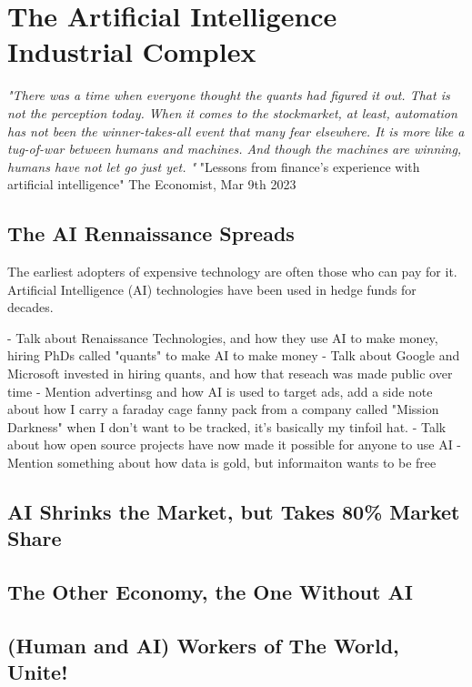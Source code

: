 \setchapterpreamble[u]{\margintoc}
\chapter{The Artificial Intelligence Industrial Complex}

\textit{"There was a time when everyone thought the quants had figured it out. That is not the perception today. When it comes to the stockmarket, at least, automation has not been the winner-takes-all event that many fear elsewhere. It is more like a tug-of-war between humans and machines. And though the machines are winning, humans have not let go just yet. "} "Lessons from finance's experience with artificial intelligence" The Economist, Mar 9th 2023 \cite{finaieconomist}


\section{The AI Rennaissance Spreads}

The earliest adopters of expensive technology are often those who can pay for it. Artificial Intelligence (AI) technologies have been used in hedge funds for decades.

- Talk about Renaissance Technologies, and how they use AI to make money, hiring PhDs called "quants" to make AI to make money
- Talk about Google and Microsoft invested in hiring quants, and how that reseach was made public over time
- Mention advertinsg and how AI is used to target ads, add a side note about how I carry a faraday cage fanny pack from a company called "Mission Darkness" when I don't want to be tracked, it's basically my tinfoil hat.
- Talk about how open source projects have now made it possible for anyone to use AI
-Mention something about how data is gold, but informaiton wants to be free

\section{AI Shrinks the Market, but Takes 80\% Market Share}

\section{The Other Economy, the One Without AI}

\section{(Human and AI) Workers of The World, Unite!}

